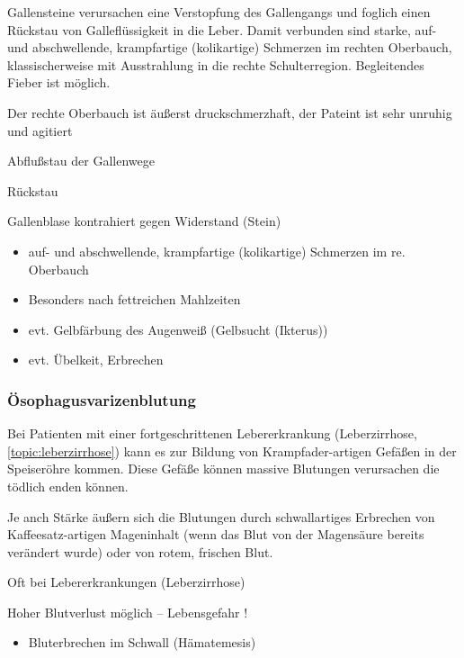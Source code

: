 \gMarried 
{Gallensteine verursachen eine Verstopfung des
Gallengangs und foglich einen Rückstau von
Galleflüssigkeit in die Leber. Damit verbunden sind
starke, auf- und abschwellende, krampfartige
(kolikartige) Schmerzen im rechten Oberbauch,
klassischerweise mit Ausstrahlung in die rechte Schulterregion. Begleitendes Fieber ist möglich.

Der rechte Oberbauch ist äußerst druckschmerzhaft, der
Pateint ist sehr unruhig und agitiert
}{Abflu{\ss}stau der Gallenwege

R\"uckstau

Gallenblase kontrahiert gegen Widerstand (Stein)


\begin{itemize}
\item auf- und abschwellende, krampfartige
(kolikartige) Schmerzen im re. Oberbauch
\item Besonders nach fettreichen Mahlzeiten
\item evt. Gelbfärbung des Augenweiß (Gelbsucht (Ikterus))
\item evt. Übelkeit, Erbrechen
\end{itemize}}




\subsubsection{\"Osophagusvarizenblutung}

\nopagebreak[4]

\gMarried
{Bei Patienten mit einer fortgeschrittenen Lebererkrankung
(Leberzirrhose, \ref{topic:leberzirrhose}) kann es zur
Bildung von Krampfader-artigen Gefäßen in der Speiseröhre
kommen. Diese Gefäße können massive Blutungen verursachen
die tödlich enden können. 

Je anch Stärke  äußern sich die Blutungen durch
schwallartiges Erbrechen von Kaffeesatz-artigen Mageninhalt (wenn das Blut von der
Magensäure bereits verändert wurde) oder von rotem,
frischen Blut. 

}
{Oft bei Lebererkrankungen (Leberzirrhose)

Hoher Blutverlust möglich -- Lebensgefahr !

\begin{itemize}
\item Bluterbrechen im Schwall (Hämatemesis)
\end{itemize}}


